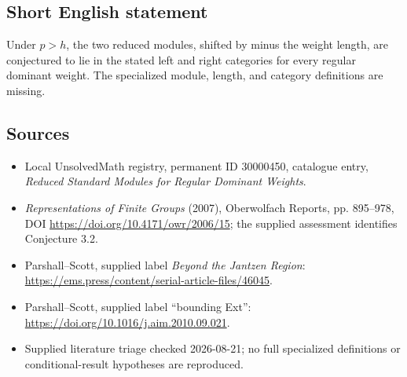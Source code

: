 \documentclass[11pt]{article}
\begin{document}
\subsection{Short English statement}
Under \(p>h\), the two reduced modules, shifted by minus the weight length, are conjectured to lie in the stated left and right categories for every regular dominant weight. The specialized module, length, and category definitions are missing.
\subsection{Sources}
\begin{itemize}
\item Local UnsolvedMath registry, permanent ID 30000450, catalogue entry, \emph{Reduced Standard Modules for Regular Dominant Weights}.
\item \emph{Representations of Finite Groups} (2007), Oberwolfach Reports, pp. 895--978, DOI \url{https://doi.org/10.4171/owr/2006/15}; the supplied assessment identifies Conjecture 3.2.
\item Parshall--Scott, supplied label \emph{Beyond the Jantzen Region}: \url{https://ems.press/content/serial-article-files/46045}.
\item Parshall--Scott, supplied label ``bounding Ext'': \url{https://doi.org/10.1016/j.aim.2010.09.021}.
\item Supplied literature triage checked 2026-08-21; no full specialized definitions or conditional-result hypotheses are reproduced.
\end{itemize}
\end{document}
